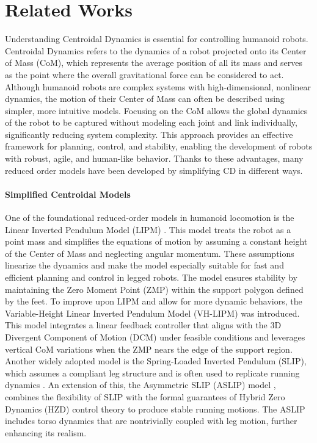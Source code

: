 \documentclass[main.tex]{subfiles}
\begin{document}
\section{Related Works}\label{sec:relatedworks}
\begin{sloppypar}
Understanding Centroidal Dynamics is essential for controlling humanoid robots. Centroidal Dynamics \cite{orin2013centroidal} refers to the dynamics of a robot projected onto its Center of Mass (CoM),  which represents the average position of all its mass and serves as the point where the overall gravitational force can be considered to act. Although humanoid robots are complex systems with high-dimensional, nonlinear dynamics, the motion of their Center of Mass can often be described using simpler, more intuitive models. Focusing on the CoM allows the global dynamics of the robot to be captured without modeling each joint and link individually, significantly reducing system complexity. This approach provides an effective framework for planning, control, and stability, enabling the development of robots with robust, agile, and human-like behavior. Thanks to these advantages, many reduced order models have been developed by simplifying CD in different ways.\\
\paragraph{Simplified Centroidal Models} One of the foundational reduced-order models in humanoid locomotion is the Linear Inverted Pendulum Model (LIPM) \cite{kajita1991study}. This model treats the robot as a point mass and simplifies the equations of motion by assuming a constant height of the Center of Mass and neglecting angular momentum. These assumptions linearize the dynamics and make the model especially suitable for fast and efficient planning and control in legged robots. The model ensures stability by maintaining the Zero Moment Point (ZMP) within the support polygon defined by the feet. To improve upon LIPM and allow for more dynamic behaviors, the Variable-Height Linear Inverted Pendulum Model (VH-LIPM) \cite{caron2020biped} was introduced. This model integrates a linear feedback controller that aligns with the 3D Divergent Component of Motion (DCM) \cite{englsberger2015three} under feasible conditions and leverages vertical CoM variations when the ZMP nears the edge of the support region. Another widely adopted model is the Spring-Loaded Inverted Pendulum (SLIP), which assumes a compliant leg structure and is often used to replicate running dynamics \cite{full1999templates, holmes2006dynamics}. An extension of this, the Asymmetric SLIP (ASLIP) model \cite{poulakakis2009spring}, combines the flexibility of SLIP with the formal guarantees of Hybrid Zero Dynamics (HZD) \cite{westervelt2003hybrid} control theory to produce stable running motions. The ASLIP includes torso dynamics that are nontrivially coupled with leg motion, further enhancing its realism.

\end{sloppypar}
\end{document}
